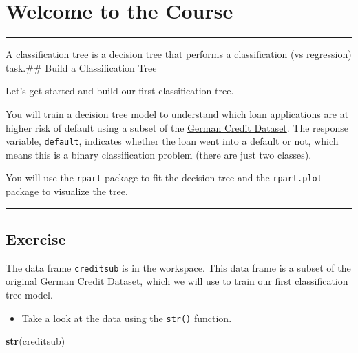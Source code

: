 \documentclass[
]{book}
\newenvironment{Shaded}{\begin{snugshade}}{\end{snugshade}}
\newcommand{\KeywordTok}[1]{\textcolor[rgb]{0.13,0.29,0.53}{\textbf{#1}}}
\newcommand{\NormalTok}[1]{#1}
\providecommand{\tightlist}{%
  \setlength{\itemsep}{0pt}\setlength{\parskip}{0pt}}
\begin{document}
\hypertarget{welcome-to-the-course}{%
\section*{Welcome to the Course}\label{welcome-to-the-course}}

\begin{center}\rule{0.5\linewidth}{0.5pt}\end{center}

A classification tree is a decision tree that performs a classification (vs regression) task.\#\# Build a Classification Tree

Let's get started and build our first classification tree.

You will train a decision tree model to understand which loan applications are at higher risk of default using a subset of the \href{https://archive.ics.uci.edu/ml/datasets/Statlog+\%28German+Credit+Data\%29}{German Credit Dataset}. The response variable, \texttt{default}, indicates whether the loan went into a default or not, which means this is a binary classification problem (there are just two classes).

You will use the \texttt{rpart} package to fit the decision tree and the \texttt{rpart.plot} package to visualize the tree.

\begin{center}\rule{0.5\linewidth}{0.5pt}\end{center}

\hypertarget{exercise}{%
\subsection*{Exercise}\label{exercise}}

The data frame \texttt{creditsub} is in the workspace. This data frame is a subset of the original German Credit Dataset, which we will use to train our first classification tree model.

\begin{itemize}
\tightlist
\item
  Take a look at the data using the \texttt{str()} function.
\end{itemize}

\begin{Shaded}
\begin{Highlighting}[]
\KeywordTok{str}\NormalTok{(creditsub)}
\end{Highlighting}
\end{Shaded}
\end{document}
